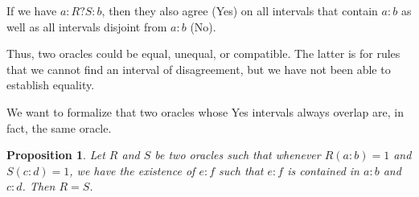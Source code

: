 \documentclass[12pt]{article}
\newtheorem{proposition}{Proposition}
\theoremstyle{remark}
\begin{document}
If we have $a:R?S:b$, then they also agree (Yes) on all intervals that contain $a:b$ as well as all intervals disjoint from $a:b$ (No). 

Thus, two oracles could be equal, unequal, or compatible. The latter is for rules that we cannot find an interval of disagreement, but we have not been able to establish equality. 

We want to formalize that two oracles whose Yes intervals always overlap are, in fact, the same oracle.

\begin{proposition}\label{pr:overlap}
Let $R$ and $S$ be two oracles such that whenever $R(a:b)=1$ and $S(c:d)=1$, we have the existence of $e:f$ such that $e:f$ is contained in $a:b$ and $c:d$.  Then $R =S$.
\end{proposition}
\end{document}
